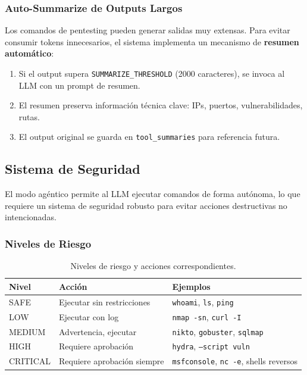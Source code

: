 \subsubsection{Auto-Summarize de Outputs Largos}

Los comandos de pentesting pueden generar salidas muy extensas. Para evitar consumir tokens innecesarios, el sistema implementa un mecanismo de \textbf{resumen automático}:

\begin{enumerate}
    \item Si el output supera \texttt{SUMMARIZE\_THRESHOLD} (2000 caracteres), se invoca al LLM con un prompt de resumen.
    \item El resumen preserva información técnica clave: IPs, puertos, vulnerabilidades, rutas.
    \item El output original se guarda en \texttt{tool\_summaries} para referencia futura.
\end{enumerate}

\subsection{Sistema de Seguridad}

El modo agéntico permite al LLM ejecutar comandos de forma autónoma, lo que requiere un sistema de seguridad robusto para evitar acciones destructivas no intencionadas.

\subsubsection{Niveles de Riesgo}

\begin{table}[H]
\centering
\renewcommand{\arraystretch}{1.2}
\begin{tabular}{|l|l|p{5cm}|}
\hline
\rowcolor[gray]{0.85}
\textbf{Nivel} & \textbf{Acción} & \textbf{Ejemplos} \\
\hline
SAFE & Ejecutar sin restricciones & \texttt{whoami}, \texttt{ls}, \texttt{ping} \\
\hline
LOW & Ejecutar con log & \texttt{nmap -sn}, \texttt{curl -I} \\
\hline
MEDIUM & Advertencia, ejecutar & \texttt{nikto}, \texttt{gobuster}, \texttt{sqlmap} \\
\hline
HIGH & Requiere aprobación & \texttt{hydra}, \texttt{--script vuln} \\
\hline
CRITICAL & Requiere aprobación siempre & \texttt{msfconsole}, \texttt{nc -e}, shells reversos \\
\hline
\end{tabular}
\caption{Niveles de riesgo y acciones correspondientes.}
\label{tab:niveles_riesgo}
\end{table}

